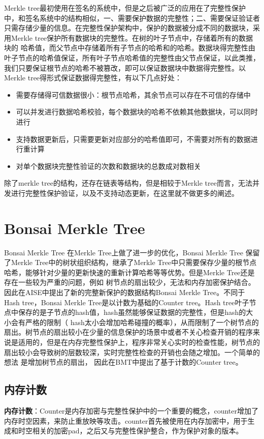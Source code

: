 Merkle tree最初使用在签名的系统中，但是之后被广泛的应用在了完整性保护中，和签名系统中的结构相似，一、需要保护数据的完整性；二、需要保证验证者只需存储少量的信息。在完整性保护架构中，保护的数据被分成不同的数据块，采用Merkle tree保护所有数据块的完整性。在树的叶子节点中，存储着所有的数据块的
哈希值，而父节点中存储着所有子节点的哈希和的哈希。数据块得完整性由叶子节点的哈希值保证，所有叶子节点哈希值的完整性由父节点保证，以此类推，我们只要保证根节点的哈希不被篡改，即可以保证数据块中数据得完整性。以Merkle tree得形式保证数据得完整性，有以下几点好处：
\begin{itemize}
    \item 需要存储得可信数据很小：根节点哈希，其余节点可以存在不可信的存储中
    \item 可以并发进行数据哈希校验，每个数据块的哈希不依赖其他数据块，可以同时进行
    \item 支持数据更新后，只需要更新对应部分的哈希值即可，不需要对所有的数据进行重计算
    \item 对单个数据块完整性验证的次数和数据块的总数成对数相关
\end{itemize}
除了merkle tree的结构，还存在链表等结构，但是相较于Merkle tree而言，无法并发进行完整性保护验证，以及不支持动态更新，在这里就不做更多的阐述。

\section{Bonsai Merkle Tree}
Bonsai Merkle Tree \cite{rogers2007using}在Merkle Tree上做了进一步的优化，Bonsai Merkle Tree 保留了Merkle Tree中的树状组织结构，继承了Merkle Tree中只需要保存少量的根节点哈希，能够针对少量的更新快速的重新计算哈希等等优势。但是Merkle Tree还是存在一些较为严重的问题，例如
树节点的扇出较少，无法和内存加密保护结合。因此在AISE中提出了新的完整新保护的数据结构Bonsai Merkle Tree。不同于Hash tree，Bonsai Merkle Tree是以计数为基础的Counter tree。Hash tree叶子节点中保存的是子节点的hash值，hash虽然能够保证数据的完整性，但是hash的大小会有严格的限制（
hash太小会增加哈希碰撞的概率），从而限制了一个树节点的扇出。树节点的扇出较小在少量的信息保护的场景中或者不关心检查开销的程序来说是适用的，但是在内存完整性保护上，程序非常关心实时的检查性能，树节点的扇出较小会导致树的层数较深，实时完整性检查的开销也会随之增加。一个简单的想法
是增加树节点的扇出， 因此在BMT中提出了基于计数的Counter tree。

\subsection{内存计数}
\textbf{内存计数}：Counter是内存加密与完整性保护中的一个重要的概念，counter增加了内存时空因素，来防止重放映等攻击。counter首先被使用在内存加密中，用于生成和时空相关的加密pad，之后又与完整性保护整合，作为保护对象的版本。


